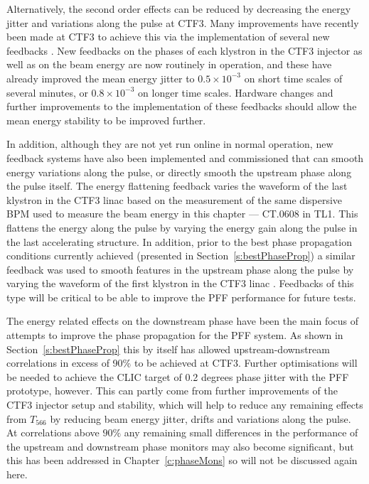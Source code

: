 Alternatively, the second order effects can be reduced by decreasing the energy jitter and variations along the pulse at CTF3. Many improvements have recently been made at CTF3 to achieve this via the implementation of several new feedbacks \cite{lukasIPAC16}. New feedbacks on the phases of each klystron in the CTF3 injector as well as on the beam energy are now routinely in operation, and these have already improved the mean energy jitter to \(0.5\times10^{-3}\) on short time scales of several minutes, or \(0.8\times10^{-3}\) on longer time scales. Hardware changes and further improvements to the implementation of these feedbacks should allow the mean energy stability to be improved further.

In addition, although they are not yet run online in normal operation, new feedback systems have also been implemented and commissioned that can smooth energy variations along the pulse, or directly smooth the upstream phase along the pulse itself. The energy flattening feedback \cite{tobiasPriv} varies the waveform of the last klystron in the CTF3 linac based on the measurement of the same dispersive BPM used to measure the beam energy in this chapter --- CT.0608 in TL1. This flattens the energy along the pulse by varying the energy gain along the pulse in the last accelerating structure. In addition, prior to the best phase propagation conditions currently achieved (presented in Section~\ref{s:bestPhaseProp}) a similar feedback was used to smooth features in the upstream phase along the pulse by varying the waveform of the first klystron in the CTF3 linac \cite{davideThesis}.
 Feedbacks of this type will be critical to be able to improve the PFF performance for future tests.



The energy related effects on the downstream phase have been the main focus of attempts to improve the phase propagation for the PFF system. As shown in Section~\ref{s:bestPhaseProp} this by itself has allowed upstream-downstream correlations in excess of 90\% to be achieved at CTF3. Further optimisations will be needed to achieve the CLIC target of 0.2 degrees phase jitter with the PFF prototype, however. This can partly come from further improvements of the CTF3 injector setup and stability, which will help to reduce any remaining effects from \(T_{566}\) by reducing beam energy jitter, drifts and variations along the pulse. At correlations above \(90\%\) any remaining small differences in the performance of the upstream and downstream phase monitors may also become significant, but this has been addressed in Chapter~\ref{c:phaseMons} so will not be discussed again here.

